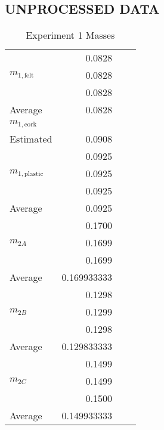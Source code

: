 \documentclass [12pt, letterpaper, twoside] {article}
\begin{document}
\subsection* {UNPROCESSED DATA}
  \begin {table}[h]
    \centering
    \begin {tabular} {| l | r | r | r |}
      \hline\hline
      \multirow {3}{*}{\(m_{1,\text{felt}}\)} & 0.0828 \\
      & 0.0828 \\
      & 0.0828 \\
      \hline
      Average & 0.0828 \\
      \hline
      \(m_{1,\text{cork}}\) & \\
      \hline
      Estimated & 0.0908 \\
      \hline
      \multirow {3}{*}{\(m_{1,\text{plastic}}\)} & 0.0925 \\
      & 0.0925 \\
      & 0.0925 \\
      \hline
      Average & 0.0925 \\
      \hline
      \multirow {3}{*}{\(m_{2A}\)} & 0.1700 \\
      & 0.1699 \\
      & 0.1699 \\
      \hline
      Average & 0.169933333 \\
      \hline
      \multirow {3}{*}{\(m_{2B}\)} & 0.1298 \\
      & 0.1299 \\
      & 0.1298 \\
      \hline
      Average & 0.129833333 \\
      \hline
      \multirow {3}{*}{\(m_{2C}\)} & 0.1499 \\
      & 0.1499 \\
      & 0.1500 \\
      \hline
      Average & 0.149933333 \\
      \hline\hline
    \end {tabular}
    \caption {Experiment 1 Masses}
  \end {table}
\end{document}
